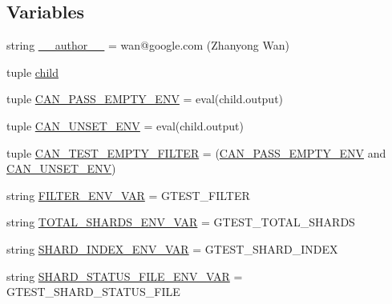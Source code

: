 \subsection*{Variables}
\begin{DoxyCompactItemize}
\item 
string \hyperlink{namespacegtest__filter__unittest_ab3118d06edfd385e21cdb729ecebb968}{\+\_\+\+\_\+author\+\_\+\+\_\+} = \textquotesingle{}wan@google.\+com (Zhanyong Wan)\textquotesingle{}
\item 
tuple \hyperlink{namespacegtest__filter__unittest_a158829096400f19be6d8a3ef8ca8b76a}{child}
\item 
tuple \hyperlink{namespacegtest__filter__unittest_a18b756ed54ae48287c75fe522af10a9c}{C\+A\+N\+\_\+\+P\+A\+S\+S\+\_\+\+E\+M\+P\+T\+Y\+\_\+\+E\+N\+V} = eval(child.\+output)
\item 
tuple \hyperlink{namespacegtest__filter__unittest_af361c1fbfcd7dccb753d66208bd86a4e}{C\+A\+N\+\_\+\+U\+N\+S\+E\+T\+\_\+\+E\+N\+V} = eval(child.\+output)
\item 
tuple \hyperlink{namespacegtest__filter__unittest_a7afca8c162042da19f58cb569805d627}{C\+A\+N\+\_\+\+T\+E\+S\+T\+\_\+\+E\+M\+P\+T\+Y\+\_\+\+F\+I\+L\+T\+E\+R} = (\hyperlink{namespacegtest__filter__unittest_a18b756ed54ae48287c75fe522af10a9c}{C\+A\+N\+\_\+\+P\+A\+S\+S\+\_\+\+E\+M\+P\+T\+Y\+\_\+\+E\+N\+V} and \hyperlink{namespacegtest__filter__unittest_af361c1fbfcd7dccb753d66208bd86a4e}{C\+A\+N\+\_\+\+U\+N\+S\+E\+T\+\_\+\+E\+N\+V})
\item 
string \hyperlink{namespacegtest__filter__unittest_a3dbe99165209787d4d138d30673c95f5}{F\+I\+L\+T\+E\+R\+\_\+\+E\+N\+V\+\_\+\+V\+A\+R} = \textquotesingle{}G\+T\+E\+S\+T\+\_\+\+F\+I\+L\+T\+E\+R\textquotesingle{}
\item 
string \hyperlink{namespacegtest__filter__unittest_a3b9a50b994f774c1cebbc52971708e4e}{T\+O\+T\+A\+L\+\_\+\+S\+H\+A\+R\+D\+S\+\_\+\+E\+N\+V\+\_\+\+V\+A\+R} = \textquotesingle{}G\+T\+E\+S\+T\+\_\+\+T\+O\+T\+A\+L\+\_\+\+S\+H\+A\+R\+D\+S\textquotesingle{}
\item 
string \hyperlink{namespacegtest__filter__unittest_a082d5120f29f56d497db94401d773ca7}{S\+H\+A\+R\+D\+\_\+\+I\+N\+D\+E\+X\+\_\+\+E\+N\+V\+\_\+\+V\+A\+R} = \textquotesingle{}G\+T\+E\+S\+T\+\_\+\+S\+H\+A\+R\+D\+\_\+\+I\+N\+D\+E\+X\textquotesingle{}
\item 
string \hyperlink{namespacegtest__filter__unittest_acc2e06353cabc6015c98bc37413a63ee}{S\+H\+A\+R\+D\+\_\+\+S\+T\+A\+T\+U\+S\+\_\+\+F\+I\+L\+E\+\_\+\+E\+N\+V\+\_\+\+V\+A\+R} = \textquotesingle{}G\+T\+E\+S\+T\+\_\+\+S\+H\+A\+R\+D\+\_\+\+S\+T\+A\+T\+U\+S\+\_\+\+F\+I\+L\+E\textquotesingle{}

\end{DoxyCompactItemize}

